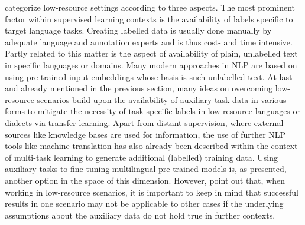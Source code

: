 \documentclass[11pt,a4paper,twoside,openright]{scrbook}
\begin{document}
\citep{hedderich-etal-2021-survey} categorize low-resource settings according to three aspects. The most prominent factor within supervised learning contexts is the availability of labels specific to target language tasks. Creating labelled data is usually done manually by adequate language and annotation experts and is thus cost- and time intensive. Partly related to this matter is the aspect of availability of plain, unlabelled text in specific languages or domains. Many modern approaches in NLP are based on using pre-trained input embeddings whose basis is such unlabelled text. At last and already mentioned in the previous section, many ideas on overcoming low-resource scenarios build upon the availability of auxiliary task data in various forms to mitigate the necessity of task-specific labels in low-resource languages or dialects via transfer learning. Apart from distant supervision, where external sources like knowledge bases are used for information, the use of further NLP tools like machine translation has also already been described within the context of multi-task learning to generate additional (labelled) training data. Using auxiliary tasks to fine-tuning multilingual pre-trained models is, as presented, another option in the space of this dimension. However, \citet{hedderich-etal-2021-survey} point out that, when working in low-resource scenarios, it is important to keep in mind that successful results in one scenario may not be applicable to other cases if the underlying assumptions about the auxiliary data do not hold true in further contexts.
\end{document}
